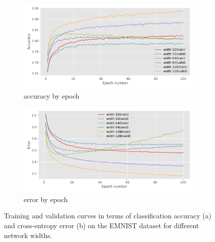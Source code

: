 {{{\begin{figure}[t]
    \centering
    \begin{subfigure}{\linewidth}
        \includegraphics[width=\linewidth]{figures/acc_curve_width.pdf}
        \caption{accuracy by epoch}
        \label{fig:width_acccurves}
    \end{subfigure}
    \begin{subfigure}{\linewidth}
        \centering
        \includegraphics[width=\linewidth]{figures/error_curve_width.pdf}
        \caption{error by epoch}
        \label{fig:width_errorcurves}
    \end{subfigure}
    \caption{Training and validation curves in terms of classification accuracy (a) and cross-entropy error (b) on the EMNIST dataset for different network widths.}
    \label{fig:width}
\end{figure}

}
}

\newcommand{\questionFigureThree} {
\youranswer{Question Figure 3 - Replace these images with figures depicting the accuracy and error, training and validation curves for your experiments varying the number of hidden layers.

}}}
